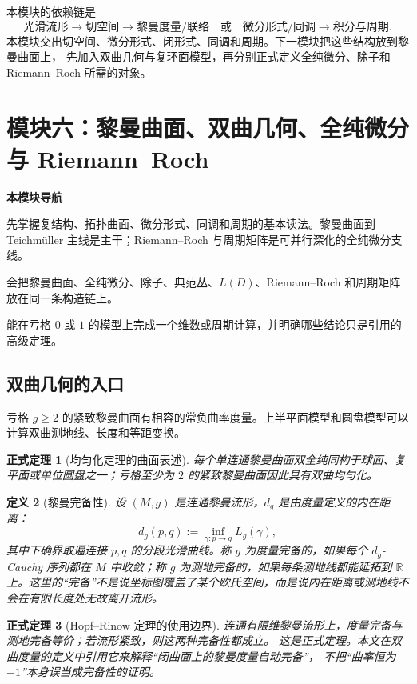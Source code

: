 \documentclass[UTF8,fontset=none,a4paper,11pt]{ctexart}
\theoremstyle{foundation-definition}
\newtheorem{definition}{定义}[section]
\theoremstyle{foundation-theorem}
\newtheorem{theorem}[definition]{正式定理}
\theoremstyle{foundation-proposition}
\theoremstyle{foundation-example}
\theoremstyle{foundation-remark}
\theoremstyle{foundation-theorem}
\newcommand{\moduleguide}[3]{%
\begin{mdframed}[backgroundcolor=definitionbg,linecolor=mainblue,linewidth=1.5pt,
  leftline=true,rightline=false,topline=false,bottomline=false,
  skipabove=9pt,skipbelow=10pt,innerleftmargin=10pt,innerrightmargin=8pt,
  innertopmargin=7pt,innerbottommargin=7pt]
{\sffamily\bfseries\color{mainblue}本模块导航}\par\smallskip
\begin{description}[style=nextline,leftmargin=2.8cm]
  \item[进入前] #1
  \item[本模块产出] #2
  \item[出口检查] #3
\end{description}
\end{mdframed}}
\begin{document}
本模块的依赖链是
\[
\text{光滑流形}
\longrightarrow
\text{切空间}
\longrightarrow
\text{黎曼度量/联络}
\quad\text{或}\quad
\text{微分形式/同调}
\longrightarrow
\text{积分与周期}.
\]
本模块交出切空间、微分形式、闭形式、同调和周期。下一模块把这些结构放到黎曼曲面上，
先加入双曲几何与复环面模型，再分别正式定义全纯微分、除子和 Riemann--Roch 所需的对象。

\clearpage
\section{模块六：黎曼曲面、双曲几何、全纯微分与 Riemann--Roch}

\moduleguide{先掌握复结构、拓扑曲面、微分形式、同调和周期的基本读法。黎曼曲面到 Teichmüller 主线是主干；Riemann--Roch 与周期矩阵是可并行深化的全纯微分支线。}{会把黎曼曲面、全纯微分、除子、典范丛、\(L(D)\)、Riemann--Roch 和周期矩阵放在同一条构造链上。}{能在亏格 \(0\) 或 \(1\) 的模型上完成一个维数或周期计算，并明确哪些结论只是引用的高级定理。}

\subsection{双曲几何的入口}

亏格 \(g\geq2\) 的紧致黎曼曲面有相容的常负曲率度量。上半平面模型和圆盘模型可以计算双曲测地线、长度和等距变换。

\begin{theorem}[均匀化定理的曲面表述]\label{thm:uniformization-surface}
每个单连通黎曼曲面双全纯同构于球面、复平面或单位圆盘之一；亏格至少为 \(2\) 的紧致黎曼曲面因此具有双曲均匀化。
\end{theorem}

\begin{definition}[黎曼完备性]\label{def:riemannian-completeness}
设 \((M,g)\) 是连通黎曼流形，\(d_g\) 是由度量定义的内在距离：
\[
d_g(p,q):=\inf_{\gamma:p\to q}L_g(\gamma),
\]
其中下确界取遍连接 \(p,q\) 的分段光滑曲线。称 \(g\) 为度量完备的，如果每个
\(d_g\)-Cauchy 序列都在 \(M\) 中收敛；称 \(g\) 为测地完备的，如果每条测地线都能延拓到
\(\mathbb R\) 上。这里的“完备”不是说坐标图覆盖了某个欧氏空间，而是说内在距离或测地线不会在有限长度处无故离开流形。
\end{definition}

\begin{theorem}[Hopf--Rinow 定理的使用边界]\label{thm:hopf-rinow}
连通有限维黎曼流形上，度量完备与测地完备等价；若流形紧致，则这两种完备性都成立。
这是正式定理。本文在双曲度量的定义中引用它来解释“闭曲面上的黎曼度量自动完备”，
不把“曲率恒为 \(-1\)”本身误当成完备性的证明。
\end{theorem}
\end{document}
